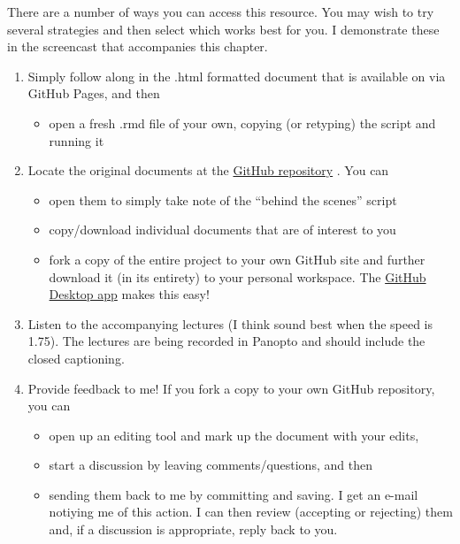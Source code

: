 \documentclass[
  english,
]{book}
\providecommand{\tightlist}{%
  \setlength{\itemsep}{0pt}\setlength{\parskip}{0pt}}
\begin{document}
There are a number of ways you can access this resource. You may wish to try several strategies and then select which works best for you. I demonstrate these in the screencast that accompanies this chapter.

\begin{enumerate}
\def\labelenumi{\arabic{enumi}.}
\tightlist
\item
  Simply follow along in the .html formatted document that is available on via GitHub Pages, and then

  \begin{itemize}
  \tightlist
  \item
    open a fresh .rmd file of your own, copying (or retyping) the script and running it
  \end{itemize}
\item
  Locate the original documents at the \href{https://github.com/lhbikos/ReC_MultivModel}{GitHub repository} . You can

  \begin{itemize}
  \tightlist
  \item
    open them to simply take note of the ``behind the scenes'' script
  \item
    copy/download individual documents that are of interest to you
  \item
    fork a copy of the entire project to your own GitHub site and further download it (in its entirety) to your personal workspace. The \href{https://desktop.github.com/}{GitHub Desktop app} makes this easy!
  \end{itemize}
\item
  Listen to the accompanying lectures (I think sound best when the speed is 1.75). The lectures are being recorded in Panopto and should include the closed captioning.
\item
  Provide feedback to me! If you fork a copy to your own GitHub repository, you can

  \begin{itemize}
  \tightlist
  \item
    open up an editing tool and mark up the document with your edits,
  \item
    start a discussion by leaving comments/questions, and then
  \item
    sending them back to me by committing and saving. I get an e-mail notiying me of this action. I can then review (accepting or rejecting) them and, if a discussion is appropriate, reply back to you.
  \end{itemize}
\end{enumerate}
\end{document}
